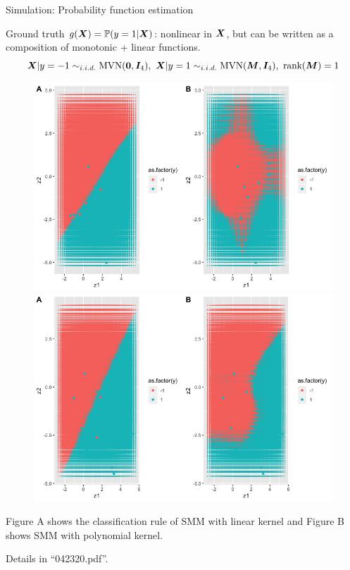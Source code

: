 \documentclass[compress,dvipsnames]{beamer}
\begin{document}
\begin{frame}{Simulation: Probability function estimation}

Ground truth $g(\bm{X})=\mathbb{P}(y=1|\bm{X})$: nonlinear in $\bm{X}$, but can be written as a composition of monotonic  + linear functions.
\[ 
\bm{X}|y=-1 \sim_{i.i.d.} \text{MVN}(\mathbf{0},\bm{I}_4), \ \bm{X}|y=1\sim_{i.i.d.} \text{MVN}(\bm{M}, \bm{I}_4),\ \text{rank}(\bm{M})=1
\]

\begin{figure}[H]
\centering
\includegraphics[width=.5\textwidth]{SMMK2.png}
\includegraphics[width=.5\textwidth]{SMMK3.png}
\end{figure}
\vspace{-.5cm}
{\small Figure A shows the classification rule of SMM with linear kernel and Figure B shows SMM with polynomial kernel.}

{\scriptsize Details in ``042320.pdf''.}
\end{frame}
\end{document}
